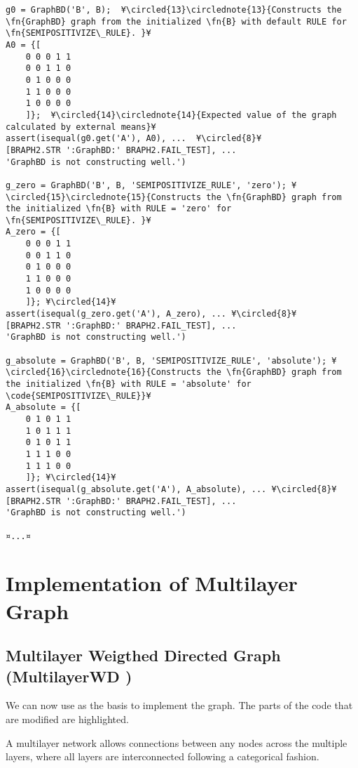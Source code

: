 \documentclass{tufte-handout}
\begin{document}
\begin{lstlisting}
g0 = GraphBD('B', B);  ¥\circled{13}\circlednote{13}{Constructs the \fn{GraphBD} graph from the initialized \fn{B} with default RULE for \fn{SEMIPOSITIVIZE\_RULE}. }¥
A0 = {[
	0 0 0 1 1
	0 0 1 1 0
	0 1 0 0 0
	1 1 0 0 0
	1 0 0 0 0
	]};  ¥\circled{14}\circlednote{14}{Expected value of the graph calculated by external means}¥
assert(isequal(g0.get('A'), A0), ...  ¥\circled{8}¥
[BRAPH2.STR ':GraphBD:' BRAPH2.FAIL_TEST], ...
'GraphBD is not constructing well.')

g_zero = GraphBD('B', B, 'SEMIPOSITIVIZE_RULE', 'zero'); ¥\circled{15}\circlednote{15}{Constructs the \fn{GraphBD} graph from the initialized \fn{B} with RULE = 'zero' for \fn{SEMIPOSITIVIZE\_RULE}. }¥
A_zero = {[
	0 0 0 1 1
	0 0 1 1 0
	0 1 0 0 0
	1 1 0 0 0
	1 0 0 0 0
	]}; ¥\circled{14}¥
assert(isequal(g_zero.get('A'), A_zero), ... ¥\circled{8}¥
[BRAPH2.STR ':GraphBD:' BRAPH2.FAIL_TEST], ...
'GraphBD is not constructing well.')

g_absolute = GraphBD('B', B, 'SEMIPOSITIVIZE_RULE', 'absolute'); ¥\circled{16}\circlednote{16}{Constructs the \fn{GraphBD} graph from the initialized \fn{B} with RULE = 'absolute' for \code{SEMIPOSITIVIZE\_RULE}}¥
A_absolute = {[
	0 1 0 1 1
	1 0 1 1 1
	0 1 0 1 1
	1 1 1 0 0
	1 1 1 0 0
	]}; ¥\circled{14}¥
assert(isequal(g_absolute.get('A'), A_absolute), ... ¥\circled{8}¥
[BRAPH2.STR ':GraphBD:' BRAPH2.FAIL_TEST], ...
'GraphBD is not constructing well.')

¤...¤
\end{lstlisting}

\clearpage
\section{Implementation of Multilayer Graph}

\subsection{Multilayer Weigthed Directed Graph (MultilayerWD )}

We can now use  as the basis to implement the  graph. The parts of the code that are modified are highlighted.

A multilayer network allows connections between any nodes across the multiple layers, where all layers are interconnected following a categorical fashion.
\end{document}
